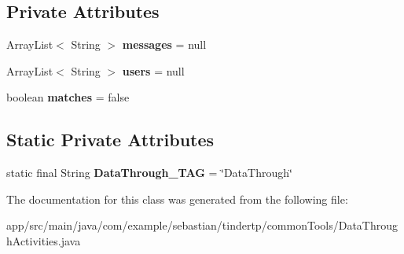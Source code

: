 \subsection*{Private Attributes}
\begin{DoxyCompactItemize}
\item 
Array\+List$<$ String $>$ {\bfseries messages} = null\hypertarget{classcom_1_1example_1_1sebastian_1_1tindertp_1_1commonTools_1_1DataThroughActivities_af6124170fb65c55f43b1f7a284f8e32d}{}\label{classcom_1_1example_1_1sebastian_1_1tindertp_1_1commonTools_1_1DataThroughActivities_af6124170fb65c55f43b1f7a284f8e32d}

\item 
Array\+List$<$ String $>$ {\bfseries users} = null\hypertarget{classcom_1_1example_1_1sebastian_1_1tindertp_1_1commonTools_1_1DataThroughActivities_a0d600cb94fad59fe0762bed9094079c7}{}\label{classcom_1_1example_1_1sebastian_1_1tindertp_1_1commonTools_1_1DataThroughActivities_a0d600cb94fad59fe0762bed9094079c7}

\item 
boolean {\bfseries matches} = false\hypertarget{classcom_1_1example_1_1sebastian_1_1tindertp_1_1commonTools_1_1DataThroughActivities_abd5e629450c09be618845cd397cd5c53}{}\label{classcom_1_1example_1_1sebastian_1_1tindertp_1_1commonTools_1_1DataThroughActivities_abd5e629450c09be618845cd397cd5c53}

\end{DoxyCompactItemize}
\subsection*{Static Private Attributes}
\begin{DoxyCompactItemize}
\item 
static final String {\bfseries Data\+Through\+\_\+\+T\+AG} = \char`\"{}Data\+Through\char`\"{}\hypertarget{classcom_1_1example_1_1sebastian_1_1tindertp_1_1commonTools_1_1DataThroughActivities_aaf9e342c71665a67acaf12193bd7a7ec}{}\label{classcom_1_1example_1_1sebastian_1_1tindertp_1_1commonTools_1_1DataThroughActivities_aaf9e342c71665a67acaf12193bd7a7ec}

\end{DoxyCompactItemize}


The documentation for this class was generated from the following file\+:\begin{DoxyCompactItemize}
\item 
app/src/main/java/com/example/sebastian/tindertp/common\+Tools/Data\+Through\+Activities.\+java\end{DoxyCompactItemize}
